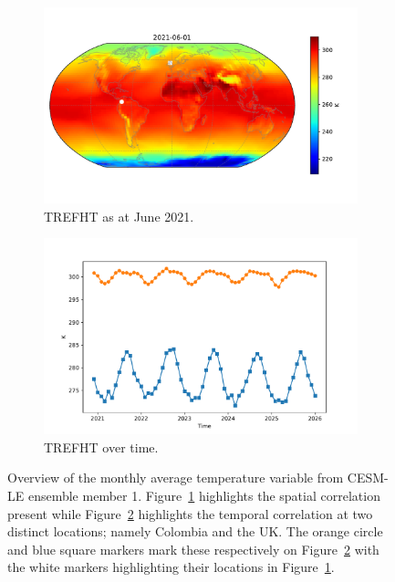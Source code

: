 \begin{figure}[htbp!] 
	\centering
	\begin{subfigure}[b]{0.45\textwidth}
		\includegraphics[width=\textwidth]{TREFHT_example}
		\caption{TREFHT as at June 2021.}
		\label{fig:temp_june}   
	\end{subfigure}             
	\begin{subfigure}[b]{0.45\textwidth}
		\includegraphics[width=\textwidth]{TREFHT_example_temp}
		\caption{TREFHT  over time.}
		\label{fig:temp_temp}
	\end{subfigure}             
	\caption[Overview of Temperature variable]{Overview of the monthly average temperature variable from CESM-LE ensemble member 1. Figure~\ref{fig:temp_june} highlights the spatial correlation present while Figure~\ref{fig:temp_temp} highlights the temporal correlation at two distinct locations; namely Colombia and the UK. The orange circle and blue square markers mark these respectively on Figure~\ref{fig:temp_temp} with the white markers highlighting their locations in Figure~\ref{fig:temp_june}.}
	\label{fig:temp_overview}
\end{figure}

